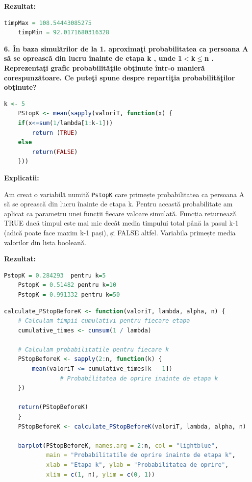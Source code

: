 \documentclass[a4paper,11pt]{article}
\begin{document}
\textbf{Rezultat:}
\begin{lstlisting}[language=R]
    timpMax = 108.54443085275
    timpMin = 92.0171680316328
\end{lstlisting}

\textbf{6. \^{I}n baza simul\u{a}rilor de la 1. aproxima\c{t}i probabilitatea ca persoana A s\u{a} se opreasc\u{a} din lucru \^{i}nainte de etapa k , unde 1$<$k$\leq$n . Reprezenta\c{t}i grafic probabilit\u{a}\c{t}ile ob\c{t}inute \^{i}ntr-o manier\u{a} corespunz\u{a}toare. Ce pute\c{t}i spune despre reparti\c{t}ia probabilit\u{a}\c{t}ilor ob\c{t}inute?}

\begin{lstlisting}[language=R]
    k <- 5
    PStopK <- mean(sapply(valoriT, function(x) {
    if(x<=sum(1/lambda[1:k-1]))
        return (TRUE)
    else
        return(FALSE)
    }))
\end{lstlisting}

\textbf{Explicatii:}

Am creat o variabilă numită \texttt{PstopK} care primește probabilitatea ca persoana A să se oprească din lucru înainte de etapa k. Pentru această probabilitate am aplicat ca parametru unei funcții fiecare valoare simulată. Funcția returnează TRUE dacă timpul este mai mic decât media timpului total până la pasul k-1 (adică poate face maxim k-1 pași), și FALSE altfel. Variabila primește media valorilor din lista booleană.

\textbf{Rezultat:}
\begin{lstlisting}[language=R]
    PstopK = 0.284293  pentru k=5
    PstopK = 0.51482 pentru k=10
    PstopK = 0.991332 pentru k=50
\end{lstlisting}

\begin{lstlisting}[language=R]
    calculate_PStopBeforeK <- function(valoriT, lambda, alpha, n) {
    # Calculam timpii cumulativi pentru fiecare etapa
    cumulative_times <- cumsum(1 / lambda)
    
    # Calculam probabilitatile pentru fiecare k
    PStopBeforeK <- sapply(2:n, function(k) {
        mean(valoriT <= cumulative_times[k - 1])  
                # Probabilitatea de oprire inainte de etapa k
    })
    
    return(PStopBeforeK)
    }
    PStopBeforeK <- calculate_PStopBeforeK(valoriT, lambda, alpha, n)

    barplot(PStopBeforeK, names.arg = 2:n, col = "lightblue",
            main = "Probabilitatile de oprire inainte de etapa k",
            xlab = "Etapa k", ylab = "Probabilitatea de oprire",
            xlim = c(1, n), ylim = c(0, 1))

    
\end{lstlisting}
\end{document}
